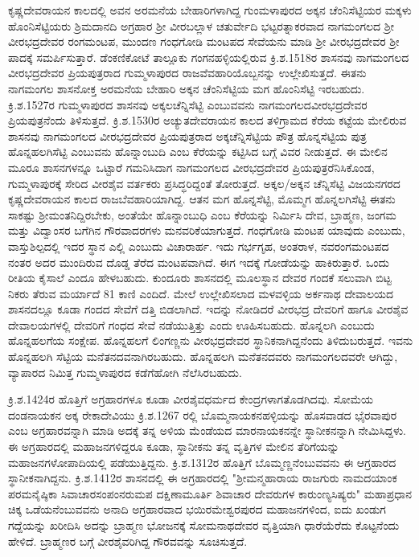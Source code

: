 ಕೃಷ್ಣದೇವರಾಯನ ಕಾಲದಲ್ಲಿ ಅವನ ಅರಮನೆಯ ಬೇಹಾರಿಗಳಾಗಿದ್ದ ಗುಂಮಳಾಪುರದ ಅಕ್ಕನ ಚೆಂನಿಸೆಟ್ಟಿಯರ ಮಕ್ಕಳು ಹೊಂನಿಸೆಟ್ಟಿಯರು ಶ್ರಿಮದಾನದಿ ಅಗ್ರಹಾರ ಶ‍್ರೀ ವೀರಬಲ್ಲಾಳ ಚತುರ್ವೇದಿ ಭಟ್ಟರತ್ನಾಕರವಾದ ನಾಗಮಂಗಲದ ಶ‍್ರೀ ವೀರಭದ್ರದೇವರ ರಂಗಮಂಟಪ, ಮುಂದಣ ಗಂಧಗೋಡಿ ಮಂಟಪದ ಸೇವೆಯನು ಮಾಡಿ ಶ‍್ರೀ ವೀರಭದ್ರದೇವರ ಶ‍್ರೀ ಪಾದಕ್ಕೆ ಸಮರ್ಪಿಸುತ್ತಾರೆ. ಡೆಂಕಣಿಕೋಟೆ ತಾಲ್ಲೂಕು ಗಂಗನಹಳ್ಳಿಯಲ್ಲಿರುವ ಕ್ರಿ.ಶ.1518ರ ಶಾಸನವು ನಾಗಮಂಗಲದ ವೀರಭದ್ರದೇವರ ಪ್ರಿಯಪುತ್ರರಾದ ಗುಮ್ಮಳಾಪುರದ ರಾಜವೆವಹಾರಿಯೊಬ್ಬನನ್ನು ಉಲ್ಲೇಖಿಸುತ್ತದೆ. ಈತನು ನಾಗಮಂಗಲ ಶಾಸನೋಕ್ತ ಅರಮನೆಯ ಬೇಹಾರಿ ಅಕ್ಕನ ಚೆಂನಿಸೆಟ್ಟಿಯ ಮಗ ಹೊಂನಿಸೆಟ್ಟಿ ಇರಬಹುದು. ಕ್ರಿ.ಶ.1527ರ ಗುಮ್ಮಳಾಪುರದ ಶಾಸನವು ಅಕ್ಕಲಚೆನ್ನಿಸೆಟ್ಟಿ ಎಂಬುವವನು ನಾಗಮಂಗಲದವೀರಭದ್ರದೇವರ ಪ್ರಿಯಪುತ್ರನೆಂದು ತಿಳಿಸುತ್ತದೆ. ಕ್ರಿ.ಶ.1530ರ ಅಚ್ಯುತದೇವರಾಯನ ಕಾಲದ ತಳಿಗ್ರಾಮದ ಕೆರೆಯ ಕಟ್ಟೆಯ ಮೇಲಿರುವ ಶಾಸನವು ನಾಗಮಂಗಲದ ವೀರಭದ್ರದೇವರ ಪ್ರಿಯಪುತ್ರರಾದ ಅಕ್ಕಚೆನ್ನಿಸೆಟ್ಟಿಯ ಪೌತ್ರ ಹೊನ್ನಸೆಟ್ಟಿಯ ಪುತ್ರ ಹೊನ್ನಹಲಗಿಸೆಟ್ಟಿ ಎಂಬುವನು ಹೊನ್ನಾಂಬುದಿ ಎಂಬ ಕೆರೆಯನ್ನು ಕಟ್ಟಿಸಿದ ಬಗ್ಗೆ ವಿವರ ನೀಡುತ್ತದೆ. ಈ ಮೇಲಿನ ಮೂರೂ ಶಾಸನಗಳನ್ನೂ ಒಟ್ಟಾರೆ ಗಮನಿಸಿದಾಗ ನಾಗಮಂಗಲದ ವೀರಭದ್ರದೇವರ ಪ್ರಿಯಪುತ್ರರೆನಿಸಿಕೊಂಡ, ಗುಮ್ಮಳಾಪುರಕ್ಕೆ ಸೇರಿದ ವೀರಶೈವ ವರ್ತಕರು ಪ್ರಸಿದ್ಧರಿದ್ದಂತೆ ತೋರುತ್ತದೆ. ಅಕ್ಕಲ/ಅಕ್ಕನ ಚೆನ್ನಿಸೆಟ್ಟಿ ವಿಜಯನಗರದ ಕೃಷ್ಣದೇವರಾಯನ ಕಾಲದ ರಾಜಬೆವಹಾರಿಯಾಗಿದ್ದ. ಆತನ ಮಗ ಹೊನ್ನಸೆಟ್ಟಿ, ಮೊಮ್ಮಗ ಹೊನ್ನಲಗಿಸೆಟ್ಟಿ ಈತನು ಸಾಕಷ್ಟು ಶ‍್ರೀಮಂತನಿದ್ದಿರಬೇಕು, ಅಂತೆಯೇ ಹೊನ್ನಾಂಬುಧಿ ಎಂಬ ಕೆರೆಯನ್ನು ನಿರ್ಮಿಸಿ ದೇವ, ಬ್ರಾಹ್ಮಣ, ಜಂಗಮ ಮತ್ತು ವಿದ್ವಾಂಸರ ಬಗೆಗಿನ ಗೌರವಾದರಗಳು ಮನವರಿಕೆಯಾಗುತ್ತದೆ. ಗಂಧಗೋಡಿ ಮಂಟಪ ಯಾವುದು ಎಂಬುದು, ವಾಸ್ತುಶಿಲ್ಪದಲ್ಲಿ ಇದರ ಸ್ಥಾನ ಎಲ್ಲಿ ಎಂಬುದು ವಿಚಾರಾರ್ಹ. ಇದು ಗರ್ಭಗೃಹ, ಅಂತರಾಳ, ನವರಂಗಮಂಟಪದ ನಂತರ ಅದರ ಮುಂದಿರುವ ದೊಡ್ಡ ತೆರೆದ ಮಂಟಪವಾಗಿದೆ. ಈಗ ಇದಕ್ಕೆ ಗೋಡೆಯನ್ನು ಹಾಕಿರುತ್ತಾರೆ. ಒಂದು ರೀತಿಯ ಕೈಸಾಲೆ ಎಂದೂ ಹೇಳಬಹುದು. ಕುಂದೂರು ಶಾಸನದಲ್ಲಿ ಮೂಲಸ್ಥಾನ ದೇವರ ಗಂದಕೆ ಸಲುವಾಗಿ ಬಿಟ್ಟ ನಿಕರು ತೆರುವ ಮರ್ಯಾದೆ 81 ಕಾಣಿ ಎಂದಿದೆ. ಮೇಲೆ ಉಲ್ಲೇಖಿಸಲಾದ ಮಳವಳ್ಳಿಯ ಅರ್ಕನಾಥ ದೇವಾಲಯದ ಶಾಸನದಲ್ಲೂ ಕೂಡಾ ಗಂದದ ಸೇವೆಗೆ ದತ್ತಿ ಬಿಡಲಾಗಿದೆ. ಇದನ್ನು ನೋಡಿದರೆ ವೀರಭದ್ರ ದೇವರಿಗೆ ಹಾಗೂ ವೀರಶೈವ ದೇವಾಲಯಗಳಲ್ಲಿ ದೇವರಿಗೆ ಗಂಧದ ಸೇವೆ ನಡೆಯುತ್ತಿತ್ತು ಎಂದು ಊಹಿಸಬಹುದು. ಹೊನ್ನಲಗಿ ಎಂಬುದು ಹೊನ್ನಹಲಗೆಯ ಸಂಕ್ಷೇಪ. ಹೊನ್ನಹಲಗೆ ಲಿಂಗಣ್ಣನು ವೀರಭದ್ರದೇವರ ಸ್ಥಾನಿಕನಾಗಿದ್ದನೆಂದು ತಿಳಿದುಬರುತ್ತದೆ. ಇವನು ಹೊನ್ನಹಲಗಿ ಸೆಟ್ಟಿಯ ಮನೆತನದವನಾಗಿರಬಹುದು. ಹೊನ್ನಹಲಗಿ ಮನೆತನದವರು ನಾಗಮಂಗಲದವರೇ ಆಗಿದ್ದು, ವ್ಯಾಪಾರದ ನಿಮಿತ್ತ ಗುಮ್ಮಳಾಪುರದ ಕಡೆಗೆಹೋಗಿ ನೆಲೆಸಿರಬಹುದು.

ಕ್ರಿ.ಶ.1424ರ ಹೊತ್ತಿಗೆ ಅಗ್ರಹಾರಗಳೂ ಕೂಡಾ ವೀರಶೈವಧರ್ಮದ ಕೇಂದ್ರಗಳಾಗತೊಡಗಿದವು. ಸೋಮೆಯ ದಂಡನಾಯಕನ ಅಕ್ಕ ರೇಕಾದೇವಿಯು ಕ್ರಿ.ಶ.1267 ರಲ್ಲಿ ಬೊಮ್ಮನಾಯಕನಹಳ್ಳಿಯನ್ನು ಹೊಸವಾಡದ ಭೈರವಾಪುರ ಎಂಬ ಅಗ್ರಹಾರವನ್ನಾಗಿ ಮಾಡಿ ಅದಕ್ಕೆ ತನ್ನ ಅಳಿಯ ಮೆಂಡೆಯದ ಮಾರನಾಯಕನನ್ನೇ ಸ್ಥಾನೀಕನನ್ನಾಗಿ ನೇಮಿಸಿದ್ದಳು. ಈ ಅಗ್ರಹಾರದಲ್ಲಿ ಮಹಾಜನಗಳಿದ್ದರೂ ಕೂಡಾ, ಸ್ಥಾನೀಕನು ತನ್ನ ವೃತ್ತಿಗಳ ಮೇಲಿನ ತೆರಿಗೆಯನ್ನು ಮಹಾಜನಗಳೋಪಾದಿಯಲ್ಲಿ ಪಡೆಯುತ್ತಿದ್ದನು. ಕ್ರಿ.ಶ.1312ರ ಹೊತ್ತಿಗೆ ಬೊಮ್ಮಣ್ಣನೆಂಬುವವನು ಈ ಆಗ್ರಹಾರದ ಸ್ಥಾನೀಕನಾಗಿದ್ದನು. ಕ್ರಿ.ಶ.1412ರ ಶಾಸನದಲ್ಲಿ ಈ ಅಗ್ರಹಾರದಲ್ಲಿ "ಶ‍್ರೀಮನ್ಮಹಾರಾಯ ರಾಜಗುರು ನಾಮದಯಾಂಕ ಪರಮನೈಷ್ಠಿಕಾ ಸಿವಾಚಾರಸಂಪಂನರುಮಪ ದಕ್ಷಿಣಾಮೂರ್ತಿ ಶಿವಾಚಾರ ದೇವರುಗಳ ಕಾರುಂಣ್ಯಸಿಷ್ಯರು" ಮಹಾಪ್ರಧಾನ ಚಿಕ್ಕ ಒಡೆಯನೆಂಬುವವನು ಅನಾದಿ ಅಗ್ರಹಾರವಾದ ಭಯಿರಮೇಶ್ವರಪುರದ ಮಹಾಜನಗಳಿಂದ, ಐದು ಖಂಡುಗ ಗದ್ದೆಯನ್ನು ಖರೀದಿಸಿ ಅದನ್ನು ಬ್ರಾಹ್ಮಣ ಭೋಜನಕ್ಕೆ ಸೋಮನಾಥದೇವರ ವೃತ್ತಿಯಾಗಿ ಧಾರೆಯೆರೆದು ಕೊಟ್ಟನೆಂದು ಹೇಳಿದೆ. ಬ್ರಾಹ್ಮಣರ ಬಗ್ಗೆ ವೀರಶೈವರಿಗಿದ್ದ ಗೌರವವನ್ನು ಸೂಚಿಸುತ್ತದೆ.

